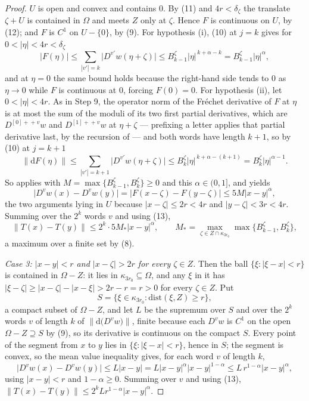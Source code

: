 \begin{proof}
$U$ is open and convex and contains $0$.  By (11) and $4r<\delta_\zeta$ the
translate $\zeta+U$ is contained in $\Omega$ and meets $Z$ only at $\zeta$.
Hence $F$ is continuous on $U$, by (12); and $F$ is $C^{1}$ on $U-\{0\}$, by
(9).  For hypothesis (i), (10) at $j=k$ gives for $0<|\eta|<4r<\delta_\zeta$
\[
  |F(\eta)|\le\sum_{|v'|=k}\bigl|D^{v'}w(\eta+\zeta)\bigr|
  \le B^{\zeta}_{k-1}|\eta|^{\,k+\alpha-k}=B^{\zeta}_{k-1}|\eta|^{\alpha},
\]
and at $\eta=0$ the same bound holds because the right-hand side tends to $0$
as $\eta\to0$ while $F$ is continuous at $0$, forcing $F(0)=0$.  For
hypothesis (ii), let $0<|\eta|<4r$.  As in Step 9, the operator norm of the
Fréchet derivative of $F$ at $\eta$ is at most the sum of the moduli of its two
first partial derivatives, which are $D^{[0]+\!\!+v}w$ and $D^{[1]+\!\!+v}w$ at
$\eta+\zeta$ --- prefixing a letter applies that partial derivative last, by the
recursion of  --- and both words have length $k+1$, so by
(10) at $j=k+1$
\[
  \|\mathrm{d}F(\eta)\|\le\sum_{|v'|=k+1}\bigl|D^{v'}w(\eta+\zeta)\bigr|
  \le B^{\zeta}_{k}|\eta|^{\,k+\alpha-(k+1)}=B^{\zeta}_{k}|\eta|^{\alpha-1}.
\]
So  applies with $M=\max\{B^{\zeta}_{k-1},B^{\zeta}_{k}\}\ge0$
and this $\alpha\in(0,1]$, and yields
\[
  \bigl|D^{v}w(x)-D^{v}w(y)\bigr|=\bigl|F(x-\zeta)-F(y-\zeta)\bigr|
  \le5M|x-y|^{\alpha},
\]
the two arguments lying in $U$ because $|x-\zeta|\le2r<4r$ and
$|y-\zeta|<3r<4r$.  Summing over the $2^{k}$ words $v$ and using (13),
\[
  \|T(x)-T(y)\|\le 2^{k}\cdot5M_{*}|x-y|^{\alpha},\qquad
  M_{*}=\max_{\zeta\in Z\cap\kappa_{3r_0}}
    \max\{B^{\zeta}_{k-1},B^{\zeta}_{k}\},
\]
a maximum over a finite set by (8).

\emph{Case 3: $|x-y|<r$ and $|x-\zeta|>2r$ for every $\zeta\in Z$.}  Then the
ball $\{\xi:|\xi-x|<r\}$ is contained in $\Omega-Z$: it lies in
$\kappa_{3r_0}\subseteq\Omega$, and any $\xi$ in it has
$|\xi-\zeta|\ge|x-\zeta|-|x-\xi|>2r-r=r>0$ for every $\zeta\in Z$.  Put
\[
  S=\bigl\{\xi\in\kappa_{3r_0}:\mathrm{dist}(\xi,Z)\ge r\bigr\},
\]
a compact subset of $\Omega-Z$, and let $L$ be the supremum over $S$ and over
the $2^{k}$ words $v$ of length $k$ of
$\|\mathrm{d}\bigl(D^{v}w\bigr)\|$, finite because each $D^{v}w$ is $C^{1}$ on
the open $\Omega-Z\supseteq S$ by (9), so its derivative is continuous on the
compact $S$.  Every point of the segment from $x$ to $y$ lies in
$\{\xi:|\xi-x|<r\}$, hence in $S$; the segment is convex, so the mean value
inequality gives, for each word $v$ of length $k$,
\[
  \bigl|D^{v}w(x)-D^{v}w(y)\bigr|\le L|x-y|
  =L|x-y|^{\alpha}|x-y|^{1-\alpha}\le L\,r^{1-\alpha}|x-y|^{\alpha},
\]
using $|x-y|<r$ and $1-\alpha\ge0$.  Summing over $v$ and using (13),
$\|T(x)-T(y)\|\le2^{k}Lr^{1-\alpha}|x-y|^{\alpha}$.


\end{proof}
